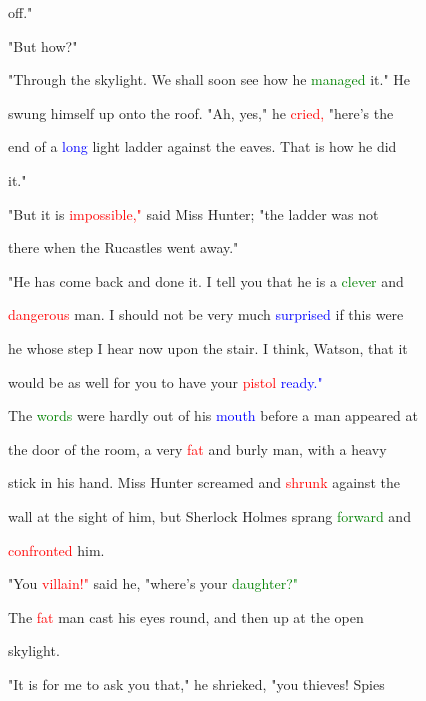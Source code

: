  off."



 "But how?"



 "Through the skylight. We shall soon see how he \textcolor{green}{managed} it." He

 swung himself up onto the roof. "Ah, yes," he \textcolor{red}{cried,} "here's the

 end of a \textcolor{blue}{long} light ladder against the eaves. That is how he did

 it."



 "But it is \textcolor{red}{impossible,"} said Miss \textcolor{BurntOrange}{Hunter;} "the ladder was not

 there when the Rucastles went away."



 "He has come back and done it. I tell you that he is a \textcolor{green}{clever} and

 \textcolor{red}{dangerous} man. I should not be very much \textcolor{blue}{surprised} if this were

 he whose step I hear now upon the stair. I think, Watson, that it

 would be as well for you to have your \textcolor{red}{pistol} \textcolor{blue}{ready."}



 The \textcolor{green}{words} were hardly out of his \textcolor{blue}{mouth} before a man appeared at

 the door of the room, a very \textcolor{red}{fat} and burly man, with a heavy

 stick in his hand. Miss \textcolor{BurntOrange}{Hunter} \textcolor{BurntOrange}{screamed} and \textcolor{red}{shrunk} against the

 wall at the sight of him, but Sherlock Holmes sprang \textcolor{green}{forward} and

 \textcolor{red}{confronted} him.



 "You \textcolor{red}{villain!"} said he, "where's your \textcolor{green}{daughter?"}



 The \textcolor{red}{fat} man cast his eyes round, and then up at the open

 skylight.



 "It is for me to ask you that," he \textcolor{BurntOrange}{shrieked,} "you \textcolor{BurntOrange}{thieves!} Spies

